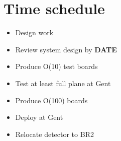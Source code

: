 \documentclass[a4paper]{article}
\begin{document}
\section{Time schedule}

\begin{itemize}
    \item Design work
    \item Review system design by {\bf DATE}
    \item Produce O(10) test boards
    \item Test at least full plane at Gent
    \item Produce O(100) boards
    \item Deploy at Gent
    \item Relocate detector to BR2
\end{itemize}
\end{document}
